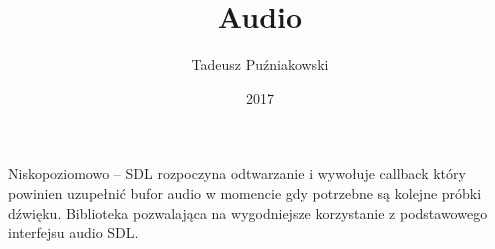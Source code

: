 \documentclass{beamer}
\title[SGD 5]{Audio}
\author{Tadeusz Puźniakowski}
\institute{PJATK}
\date{2017}
\begin{document}
\frame{\titlepage}


\begin{frame}[fragile]
	Niskopoziomowo -- SDL rozpoczyna odtwarzanie i wywołuje callback który powinien uzupełnić bufor audio w momencie gdy potrzebne są kolejne próbki dźwięku.
	\EB
	Biblioteka pozwalająca na wygodniejsze korzystanie z podstawowego interfejsu audio SDL.
	\EB
\end{frame}
\end{document}
